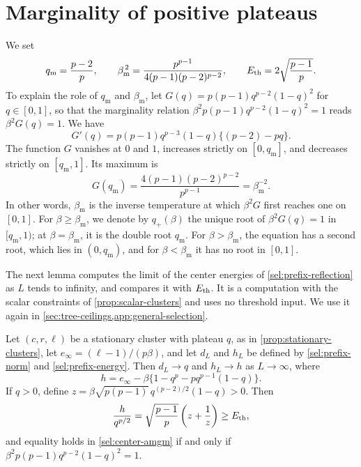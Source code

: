 \section{Marginality of positive plateaus}\label{sec:marginality}

We set
\begin{equation}
 q_{\mathrm m}=\frac{p-2}{p},\qquad
 \beta_{\mathrm m}^{\,2}=\frac{p^{p-1}}{4(p-1)(p-2)^{p-2}},\qquad
 E_{\mathrm{th}}=2\sqrt{\frac{p-1}{p}}.
 \label{sel:spinodal-constants}
\end{equation}
To explain the role of $q_{\mathrm m}$ and $\beta_{\mathrm m}$, let $G(q)=p(p-1)q^{p-2}(1-q)^2$ for $q\in[0,1]$, so that the marginality relation $\beta^2p(p-1)q^{p-2}(1-q)^2=1$ reads $\beta^2G(q)=1$. We have
\[
 G'(q)=p(p-1)q^{p-3}(1-q)\bigl\{(p-2)-pq\bigr\}.
\]
The function $G$ vanishes at $0$ and $1$, increases strictly on $[0,q_{\mathrm m}]$, and decreases strictly on $[q_{\mathrm m},1]$. Its maximum is
\[
 G(q_{\mathrm m})=\frac{4(p-1)(p-2)^{p-2}}{p^{p-1}}=\beta_{\mathrm m}^{-2}.
\]
In other words, $\beta_{\mathrm m}$ is the inverse temperature at which $\beta^2G$ first reaches one on $[0,1]$. For $\beta\ge\beta_{\mathrm m}$, we denote by $q_+(\beta)$ the unique root of $\beta^2G(q)=1$ in $[q_{\mathrm m},1)$; at $\beta=\beta_{\mathrm m}$, it is the double root $q_{\mathrm m}$. For $\beta>\beta_{\mathrm m}$, the equation has a second root, which lies in $(0,q_{\mathrm m})$, and for $\beta<\beta_{\mathrm m}$ it has no root in $[0,1]$.

The next lemma computes the limit of the center energies of \cref{sel:prefix-reflection} as $L$ tends to infinity, and compares it with $E_{\mathrm{th}}$. It is a computation with the scalar constraints of \cref{prop:scalar-clusters} and uses no threshold input. We use it again in \cref{sec:tree-ceilings,app:general-selection}.

\begin{lemma}\label{lem:center-energy}
Let $(c,r,\ell)$ be a stationary cluster with plateau $q$, as in \cref{prop:stationary-clusters}, let $e_\infty=(\ell-1)/(p\beta)$, and let $d_L$ and $h_L$ be defined by \eqref{sel:prefix-norm} and \eqref{sel:prefix-energy}. Then $d_L\to q$ and $h_L\to h$ as $L\to\infty$, where
\begin{equation}
 h=e_\infty-\beta\bigl\{1-q^p-pq^{p-1}(1-q)\bigr\}.
 \label{sel:limiting-center-energy}
\end{equation}
If $q>0$, define $z=\beta\sqrt{p(p-1)}\,q^{(p-2)/2}(1-q)>0$. Then
\begin{equation}
 \frac{h}{q^{p/2}}
 =\sqrt{\frac{p-1}{p}}\left(z+\frac1z\right)
 \ge E_{\mathrm{th}},
 \label{sel:center-amgm}
\end{equation}
and equality holds in \eqref{sel:center-amgm} if and only if $\beta^2p(p-1)q^{p-2}(1-q)^2=1$.
\end{lemma}

